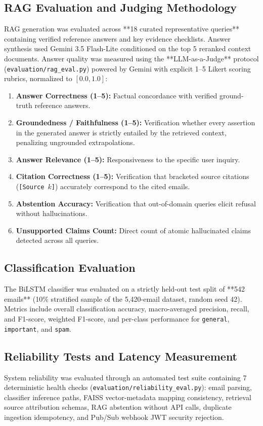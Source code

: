 \documentclass[11pt,a4paper]{article}
\begin{document}
\subsection{RAG Evaluation and Judging Methodology}
RAG generation was evaluated across **18 curated representative queries** containing verified reference answers and key evidence checklists. Answer synthesis used Gemini 3.5 Flash-Lite conditioned on the top 5 reranked context documents. Answer quality was measured using the **LLM-as-a-Judge** protocol (\texttt{evaluation/rag\_eval.py}) powered by Gemini with explicit 1--5 Likert scoring rubrics, normalized to $[0.0, 1.0]$:
\begin{enumerate}
    \item \textbf{Answer Correctness (1--5):} Factual concordance with verified ground-truth reference answers.
    \item \textbf{Groundedness / Faithfulness (1--5):} Verification whether every assertion in the generated answer is strictly entailed by the retrieved context, penalizing ungrounded extrapolations.
    \item \textbf{Answer Relevance (1--5):} Responsiveness to the specific user inquiry.
    \item \textbf{Citation Correctness (1--5):} Verification that bracketed source citations (\texttt{[Source $k$]}) accurately correspond to the cited emails.
    \item \textbf{Abstention Accuracy:} Verification that out-of-domain queries elicit refusal without hallucinations.
    \item \textbf{Unsupported Claims Count:} Direct count of atomic hallucinated claims detected across all queries.
\end{enumerate}

\subsection{Classification Evaluation}
The BiLSTM classifier was evaluated on a strictly held-out test split of **542 emails** (10\% stratified sample of the 5,420-email dataset, random seed 42). Metrics include overall classification accuracy, macro-averaged precision, recall, and F1-score, weighted F1-score, and per-class performance for \texttt{general}, \texttt{important}, and \texttt{spam}.

\subsection{Reliability Tests and Latency Measurement}
System reliability was evaluated through an automated test suite containing 7 deterministic health checks (\texttt{evaluation/reliability\_eval.py}): email parsing, classifier inference paths, FAISS vector-metadata mapping consistency, retrieval source attribution schemas, RAG abstention without API calls, duplicate ingestion idempotency, and Pub/Sub webhook JWT security rejection.
\end{document}
